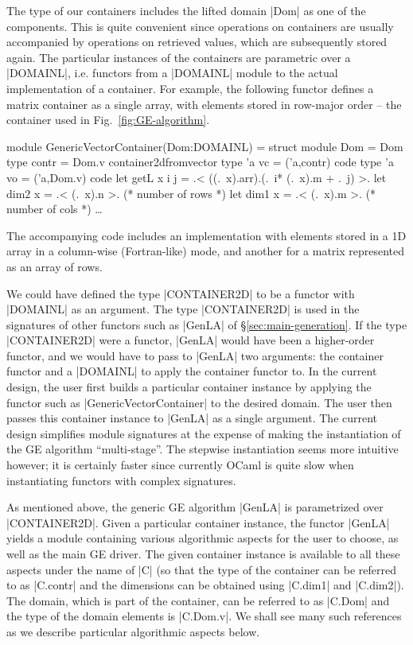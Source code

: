 \documentclass{elsart}
\begin{document}
The type of our containers includes the lifted domain |Dom| as one of
the components. This is quite convenient since operations on
containers are usually accompanied by operations on retrieved values,
which are subsequently stored again.
The particular instances of the containers are
parametric over a |DOMAINL|, i.e. functors from a |DOMAINL| module to
the actual implementation of a container.  For example, the following
functor defines a matrix container as a single array, with elements
stored in row-major order -- the container used in
Fig.~\ref{fig:GE-algorithm}.
\begin{code}[commandchars=\\\{\}]
module GenericVectorContainer(Dom:DOMAINL) =
  struct
  module Dom = Dom
  type contr = Dom.v container2dfromvector
  type 'a vc = ('a,contr) code
  type 'a vo = ('a,Dom.v) code
  let getL x i j = .< ((.~x).arr).(.~i* (.~x).m + .~j) >.
  let dim2 x = .< (.~x).n >.      (* number of rows *)
  let dim1 x = .< (.~x).m >.      (* number of cols *)
  \dots
\end{code}
The accompanying code \cite{metamonadsURL} includes an implementation with
elements stored in a 1D array in a column-wise (Fortran-like)
mode, and another for a matrix represented as an array of rows.

We could have defined the type |CONTAINER2D| to be a functor with
|DOMAINL| as an argument. The type |CONTAINER2D| is used in the
signatures of other functors such as |GenLA| of
\S\ref{sec:main-generation}. If the type |CONTAINER2D| were a
functor, |GenLA| would have been a higher-order functor, and we would
have to pass to |GenLA| two arguments: the container functor and a
|DOMAINL| to apply the container functor to. In the current design,
the user first builds a particular container instance by applying the
functor such as |GenericVectorContainer| to the desired domain. The
user then passes this container instance to |GenLA| as a single
argument. The current design simplifies module signatures at
the expense of making the instantiation of the GE algorithm
``multi-stage''. The stepwise instantiation seems more intuitive
however; it is certainly faster since currently OCaml is quite slow
when instantiating functors with complex signatures.

As mentioned above, the generic GE algorithm |GenLA| is parametrized
over |CONTAINER2D|.  Given a particular container instance, the
functor |GenLA| yields a module containing various algorithmic aspects
for the user to choose, as well as the main GE driver. The given
container instance is available to all these aspects under the name of
|C| (so that the type of the container can be referred to as |C.contr|
and the dimensions can be obtained using |C.dim1| and |C.dim2|). The
domain, which is part of the container, can be referred to as
|C.Dom| and the type of the domain elements is |C.Dom.v|. We shall see
many such references as we describe particular algorithmic aspects
below.
\end{document}
